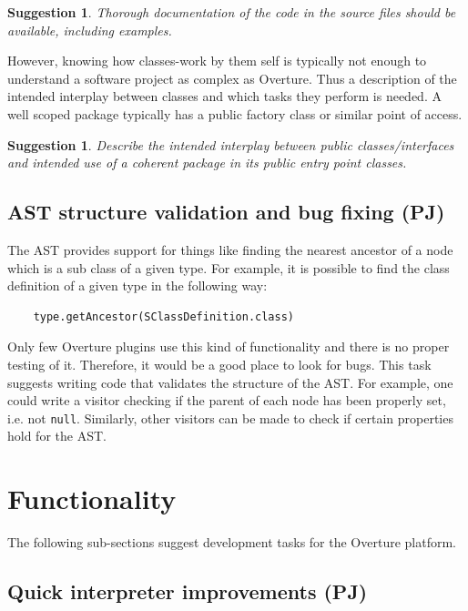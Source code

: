 \documentclass[11pt]{overturerep}
\newtheorem{sug}[subsection]{Suggestion}
\begin{document}
\begin{sug} Thorough documentation of the code in the source files
    should be available, including examples. 
\end{sug}

However, knowing how classes-work by them self is typically not enough
to understand a software project as complex as Overture.  Thus a
description of the intended interplay between classes and which tasks
they perform is needed.  A well scoped package typically has a public
factory class or similar point of access.

\begin{sug} 
    Describe the intended interplay between \emph{public}
    classes/interfaces and intended use of a coherent package in its
    public entry point classes. 
\end{sug}

\section{AST structure validation and bug fixing (PJ)}

The AST provides support for things like finding the nearest
ancestor of a node which is a sub class of a given type. For
example, it is possible to find the class definition of a given
type in the following way:

\begin{lstlisting} 
    type.getAncestor(SClassDefinition.class) 
\end{lstlisting}

Only few Overture plugins use this kind of functionality and there
is no proper testing of it. Therefore, it would be a good place to
look for bugs. This task suggests writing code that validates the
structure of the AST. For example, one could write a visitor
checking if the parent of each node has been properly set, i.e. not
\texttt{null}. Similarly, other visitors can be made to check if
certain properties hold for the AST.







\chapter{Functionality}

The following sub-sections suggest development tasks for the
Overture platform.

\section{Quick interpreter improvements (PJ)}
\end{document}
